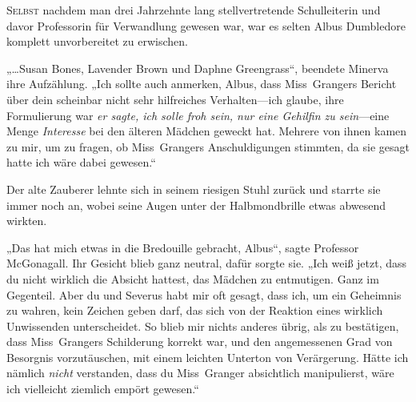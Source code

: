 
\lettrine{S}{elbst} nachdem man drei Jahrzehnte lang stellvertretende Schulleiterin und davor Professorin für Verwandlung gewesen war, war es selten Albus Dumbledore komplett unvorbereitet zu erwischen.

„…Susan Bones, Lavender Brown und Daphne Greengrass“, beendete Minerva ihre Aufzählung.
„Ich sollte auch anmerken, Albus, dass Miss~Grangers Bericht über dein scheinbar nicht sehr hilfreiches Verhalten—ich glaube, ihre Formulierung war \emph{er sagte, ich solle froh sein, nur eine Gehilfin zu sein}—eine Menge \emph{Interesse} bei den älteren Mädchen geweckt hat. Mehrere von ihnen kamen zu mir, um zu fragen, ob Miss~Grangers Anschuldigungen stimmten, da sie gesagt hatte ich wäre dabei gewesen.“

Der alte Zauberer lehnte sich in seinem riesigen Stuhl zurück und starrte sie immer noch an, wobei seine Augen unter der Halbmondbrille etwas abwesend wirkten.

„Das hat mich etwas in die Bredouille gebracht, Albus“, sagte Professor McGonagall. Ihr Gesicht blieb ganz neutral, dafür sorgte sie.
„Ich weiß jetzt, dass du nicht wirklich die Absicht hattest, das Mädchen zu entmutigen. Ganz im Gegenteil. Aber du und Severus habt mir oft gesagt, dass ich, um ein Geheimnis zu wahren, kein Zeichen geben darf, das sich von der Reaktion eines wirklich Unwissenden unterscheidet. So blieb mir nichts anderes übrig, als zu bestätigen, dass Miss~Grangers Schilderung korrekt war, und den angemessenen Grad von Besorgnis vorzutäuschen, mit einem leichten Unterton von Verärgerung. Hätte ich nämlich \emph{nicht} verstanden, dass du Miss~Granger absichtlich manipulierst, wäre ich vielleicht ziemlich empört gewesen.“

